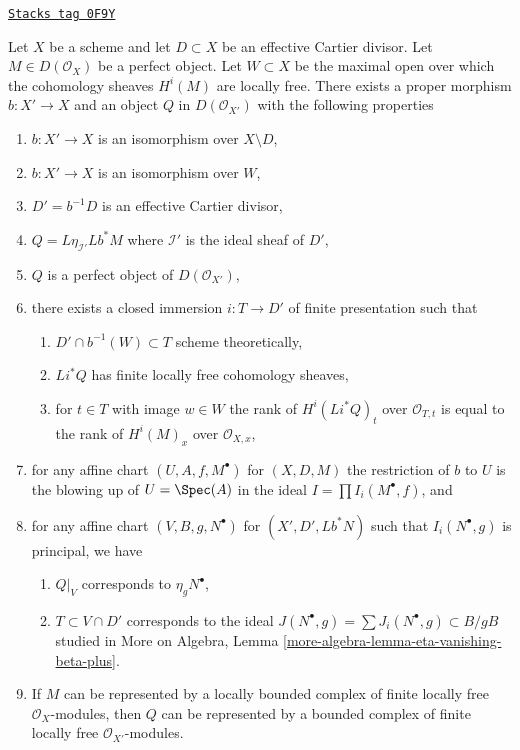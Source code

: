\begin{lemma}
\label{flat-lemma-complex-and-divisor-derived}
\href{https://stacks.math.columbia.edu/tag/0F9Y}{\texttt{Stacks tag 0F9Y}}

Let $X$ be a scheme and let $D \subset X$ be an effective Cartier divisor. Let
$M \in D(\mathcal{O}_X)$ be a perfect object. Let $W \subset X$ be the maximal
open over which the cohomology sheaves $H^i(M)$ are locally free.
There exists a proper morphism $b : X' \longrightarrow X$
and an object $Q$ in $D(\mathcal{O}_{X'})$ with the following properties
\begin{enumerate}
\item $b : X' \to X$ is an isomorphism over $X \setminus D$,
\item $b : X' \to X$ is an isomorphism over $W$,
\item $D' = b^{-1}D$ is an effective Cartier divisor,
\item $Q = L\eta_{\mathcal{I}'}Lb^*M$ where $\mathcal{I}'$
is the ideal sheaf of $D'$,
\item $Q$ is a perfect object of $D(\mathcal{O}_{X'})$,
\item there exists a closed immersion $i : T \to D'$ of finite presentation
such that
\begin{enumerate}
\item $D' \cap b^{-1}(W) \subset T$ scheme theoretically,
\item $Li^*Q$ has finite locally free cohomology sheaves,
\item for $t \in T$ with image $w \in W$ the rank
of $H^i(Li^*Q)_t$ over $\mathcal{O}_{T, t}$ is equal to the
rank of $H^i(M)_x$ over $\mathcal{O}_{X, x}$,
\end{enumerate}
\item for any affine chart $(U, A, f, M^\bullet)$ for $(X, D, M)$
the restriction of $b$ to $U$ is the blowing up of $U = \Spec(A)$
in the ideal $I = \prod I_i(M^\bullet, f)$, and
\item for any affine chart $(V, B, g, N^\bullet)$ for $(X', D', Lb^*N)$
such that $I_i(N^\bullet, g)$ is principal, we have
\begin{enumerate}
\item $Q|_V$ corresponds to $\eta_gN^\bullet$,
\item $T \subset V \cap D'$ corresponds to the ideal
$J(N^\bullet, g) = \sum J_i(N^\bullet, g) \subset B/gB$
studied in
More on Algebra, Lemma \ref{more-algebra-lemma-eta-vanishing-beta-plus}.
\end{enumerate}
\item If $M$ can be represented by a locally bounded complex
of finite locally free $\mathcal{O}_X$-modules, then $Q$ can
be represented by a bounded complex of finite locally free
$\mathcal{O}_{X'}$-modules.
\end{enumerate}
\end{lemma}

